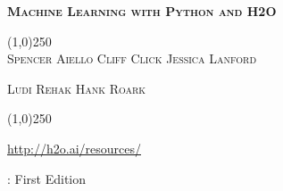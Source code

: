 


\newcommand{\waterVersion}{3.3}






\thispagestyle{empty} %


\begin{center}
\textsc{\Large\bf{Machine Learning with Python and H2O}}

\bigskip
\line(1,0){250}  %
\\
\bigskip
\small
\textsc{Spencer Aiello \hspace{10pt} Cliff Click \hspace{10pt} Jessica Lanford \hspace{10pt} }

\textsc{Ludi Rehak \hspace{10pt} Hank Roark}

\normalsize

\line(1,0){250}  %

{\url{http://h2o.ai/resources/}}

\bigskip

\monthname \hspace{1pt}  \the\year: First Edition 

\bigskip
\end{center}


\newpage
\restoregeometry

\null\vfill %

\thispagestyle{empty}%

